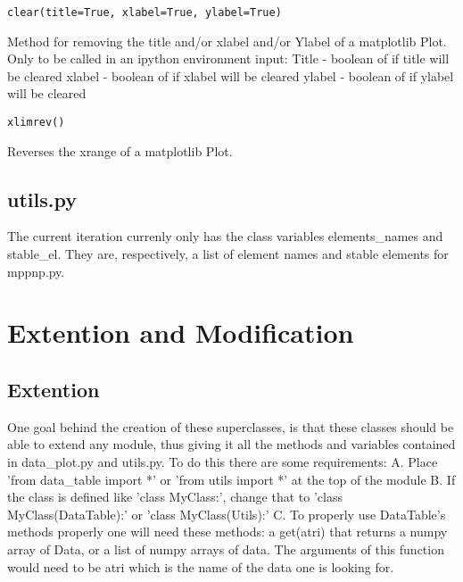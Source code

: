 		
\begin{verbatim}
clear(title=True, xlabel=True, ylabel=True)
\end{verbatim}
Method for removing the title and/or xlabel and/or Ylabel
		of a matplotlib Plot.  Only to be called in an ipython 
		environment\newline
		input:\newline
		Title -  boolean of if title will be cleared \newline
		xlabel - boolean of if xlabel will be cleared \newline
		ylabel - boolean of if ylabel will be cleared \newline\newline

\begin{verbatim}
xlimrev()
\end{verbatim}
Reverses the xrange of a matplotlib Plot.\newline\newline
\subsection{utils.py}
The current iteration currenly only has the class variables elements\_names and stable\_el.
They are, respectively, a list of element names and stable elements for mppnp.py.

\section{Extention and Modification}

\subsection{Extention}

One goal behind the creation of these superclasses, is that these classes should be able to extend any module, thus giving it all the methods and variables contained in 
data\_plot.py and utils.py.  To do this there are some requirements:\newline
A. Place 'from data\_table import *' or 'from utils import *' at the top of the module\newline
B. If the class is defined like 'class MyClass:', change that to 
   'class MyClass(DataTable):' or 'class MyClass(Utils):'\newline
C. To properly use DataTable's methods properly one will need these methods:
	a get(atri) that returns a numpy array of Data, or a 
	list of numpy arrays of data.  The arguments of this function would need to be
	atri which is the name of the data one is looking for.\newline\newline

